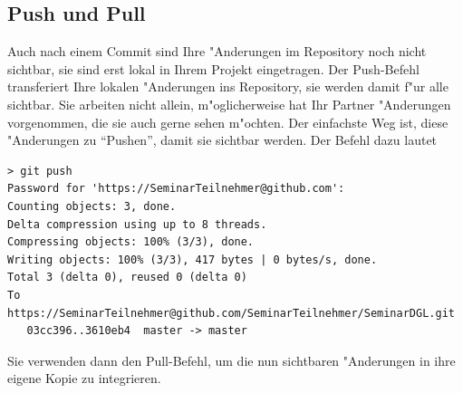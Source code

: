 \documentclass[a4paper,12pt]{article}
\begin{document}
\subsection{Push und Pull}
Auch nach einem Commit sind Ihre "Anderungen im Repository noch nicht
sichtbar, sie sind erst lokal in Ihrem Projekt eingetragen.
Der Push-Befehl transferiert Ihre lokalen "Anderungen ins Repository,
sie werden damit f"ur alle sichtbar.
Sie arbeiten nicht allein, m"oglicherweise hat Ihr Partner "Anderungen
vorgenommen, die sie auch gerne sehen m"ochten.
Der einfachste Weg ist, diese "Anderungen zu ``Pushen'', damit sie
sichtbar werden.
Der Befehl dazu lautet
\begin{verbatim}
> git push
Password for 'https://SeminarTeilnehmer@github.com': 
Counting objects: 3, done.
Delta compression using up to 8 threads.
Compressing objects: 100% (3/3), done.
Writing objects: 100% (3/3), 417 bytes | 0 bytes/s, done.
Total 3 (delta 0), reused 0 (delta 0)
To https://SeminarTeilnehmer@github.com/SeminarTeilnehmer/SeminarDGL.git
   03cc396..3610eb4  master -> master
\end{verbatim}
Sie verwenden dann den Pull-Befehl, um die nun sichtbaren "Anderungen
in ihre eigene Kopie zu integrieren.
\end{document}
